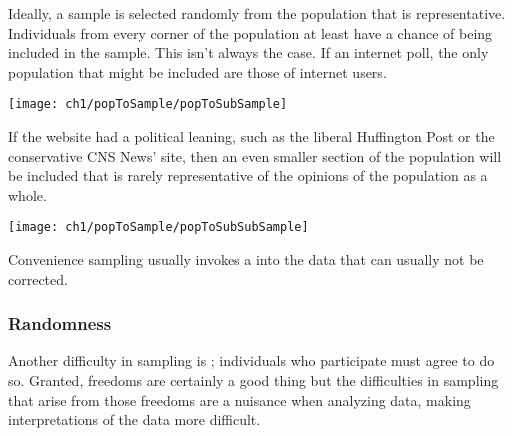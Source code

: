 Ideally, a sample is selected randomly from the population that is representative. Individuals from every corner of the population at least have a chance of being included in the sample. This isn't always the case. If an internet poll, the only population that might be included are those of internet users.
\begin{center}
   \texttt{[image: ch1/popToSample/popToSubSample]}
\end{center}
If the website had a political leaning, such as the liberal Huffington Post or the conservative CNS News' site, then an even smaller section of the population will be included that is rarely representative of the opinions of the population as a whole.
\begin{center}
   \texttt{[image: ch1/popToSample/popToSubSubSample]}
\end{center}
Convenience sampling usually invokes a  into the data that can usually not be corrected.

\subsubsection{Randomness}

Another difficulty in sampling is ; individuals who participate must agree to do so. Granted, freedoms are certainly a good thing but the difficulties in sampling that arise from those freedoms are a nuisance when analyzing data, making interpretations of the data more difficult.

